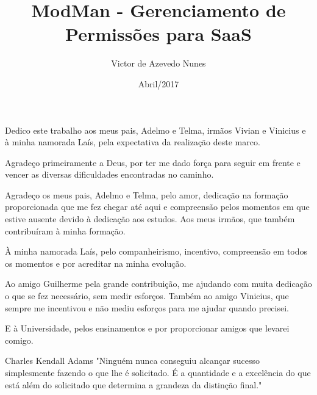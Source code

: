 \documentclass[pt,oneside,onehalfspacing,bsc]{risethesis}
\title{ModMan - Gerenciamento de Permissões para SaaS}
\date{Abril/2017}
\author{Victor de Azevedo Nunes}
\begin{document}
\frontmatter
\frontpage
\presentationpage

\begin{dedicatory}
Dedico este trabalho aos meus pais, Adelmo e Telma, irmãos Vivian e Vinicius e à minha namorada Laís, pela expectativa da realização deste marco.
\end{dedicatory}

\acknowledgements
Agradeço primeiramente a Deus, por ter me dado força para seguir em frente e vencer as diversas dificuldades encontradas no caminho. 

Agradeço os meus pais, Adelmo e Telma, pelo amor, dedicação na formação proporcionada que me fez chegar até aqui e compreensão pelos momentos em que estive ausente devido à dedicação aos estudos. Aos meus irmãos, que também contribuíram à minha formação. 

À minha namorada Laís, pelo companheirismo, incentivo, compreensão em todos os momentos e por acreditar na minha evolução.

Ao amigo Guilherme pela grande contribuição, me ajudando com muita dedicação o que se fez necessário, sem medir esforços. Também ao amigo Vinicius, que sempre me incentivou e não mediu esforços para me ajudar quando precisei.

E à Universidade, pelos ensinamentos e por proporcionar amigos que levarei comigo.

\begin{epigraph}[]{Charles Kendall Adams}
"Ninguém nunca conseguiu alcançar sucesso simplesmente fazendo o que lhe é solicitado. É a quantidade e a excelência do que está além do solicitado que determina a grandeza da distinção final."
\end{epigraph}

\resumo


\abstract


\tableofcontents

\listoffigures

\listoftables

\listofacronyms



\mainmatter









\clearpage
\addappheadtotoc
\appendix
\appendixpage

\end{document}

